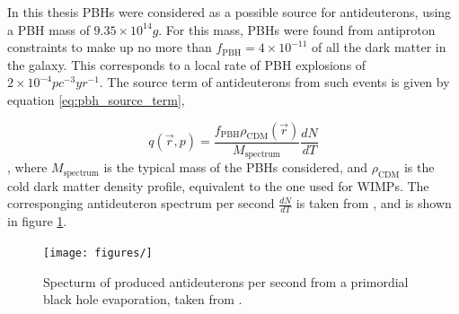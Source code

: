 In this thesis PBHs were considered as a possible source for antideuterons, using a PBH mass of $9.35\times 10^{14}g$. For this mass, PBHs were found from antiproton constraints to make up no more than $f_\mathrm{PBH} = 4\times 10^{-11}$ of all the dark matter in the galaxy. This corresponds to a local rate of PBH explosions of $2\times 10^{-4} pc^{-3}yr^{-1}$. The source term of antideuterons from such events is given by equation \ref{eq:pbh_source_term},

\begin{equation}\label{eq:pbh_source_term}
		q ( \vec{r}, p) = \frac{f_\mathrm{PBH} \rho_{\mathrm{CDM}} (\vec{r})}{M_\mathrm{spectrum}}\frac{dN}{dT}

\end{equation}
, where $M_\mathrm{spectrum}$ is the typical mass of the PBHs considered, and $\rho_\mathrm{CDM}$ is the cold dark matter density profile, equivalent to the one used for WIMPs. The corresponging antideuteron spectrum per second $\frac{dN}{dT}$ is taken from \cite{}, and is shown in figure \ref{fig:pbh_source_spectrum}.

\begin{figure}[hbtp]
		\centering
		\texttt{[image: figures/]}
		\label{fig:pbh_source_spectrum}
		\caption{Specturm of produced antideuterons per second from a primordial black hole evaporation, taken from \cite{}.}
\end{figure}



